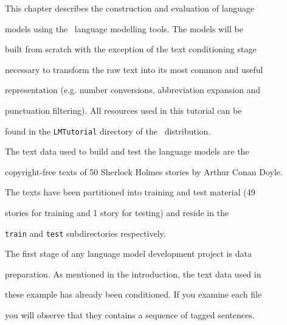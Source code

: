 %




%




%










This chapter describes the construction and evaluation of language


models using the \HTK\ language modelling tools. The models will be


built from scratch with the exception of the text conditioning stage


necessary to transform the raw text into its most common and useful


representation (e.g. number conversions, abbreviation expansion and


punctuation filtering). All resources used in this tutorial can be


found in the \texttt{LMTutorial} directory of the \HTK\ distribution.





The text data used to build and test the language models are the


copyright-free texts of 50 Sherlock Holmes stories by Arthur Conan Doyle.


The texts have been partitioned into training and test material (49


stories for training and 1 story for testing) and reside in the


\texttt{train} and \texttt{test} subdirectories respectively.










The first stage of any language model development project is data


preparation. As mentioned in the introduction, the text data used in


these example has already been conditioned.  If you examine each file


you will observe that they contains a sequence of tagged sentences.


